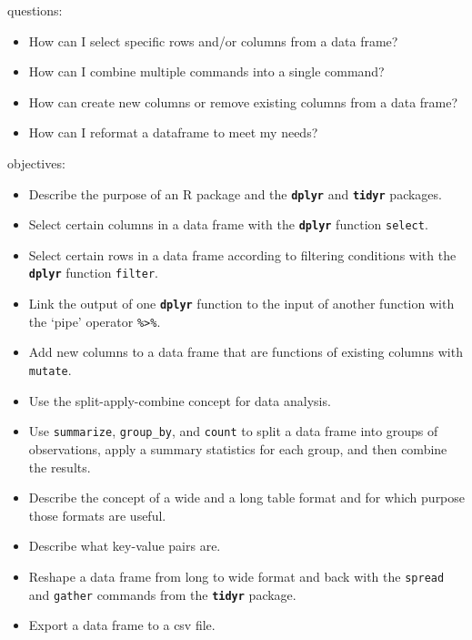 \documentclass[]{book}
\providecommand{\tightlist}{%
  \setlength{\itemsep}{0pt}\setlength{\parskip}{0pt}}
\begin{document}
questions:

\begin{itemize}
\tightlist
\item
  How can I select specific rows and/or columns from a data frame?\\
\item
  How can I combine multiple commands into a single command?\\
\item
  How can create new columns or remove existing columns from a data
  frame?\\
\item
  How can I reformat a dataframe to meet my needs?
\end{itemize}

objectives:

\begin{itemize}
\tightlist
\item
  Describe the purpose of an R package and the \textbf{\texttt{dplyr}}
  and \textbf{\texttt{tidyr}} packages.\\
\item
  Select certain columns in a data frame with the
  \textbf{\texttt{dplyr}} function \texttt{select}.\\
\item
  Select certain rows in a data frame according to filtering conditions
  with the \textbf{\texttt{dplyr}} function \texttt{filter}.\\
\item
  Link the output of one \textbf{\texttt{dplyr}} function to the input
  of another function with the `pipe' operator
  \texttt{\%\textgreater{}\%}.\\
\item
  Add new columns to a data frame that are functions of existing columns
  with \texttt{mutate}.\\
\item
  Use the split-apply-combine concept for data analysis.\\
\item
  Use \texttt{summarize}, \texttt{group\_by}, and \texttt{count} to
  split a data frame into groups of observations, apply a summary
  statistics for each group, and then combine the results.\\
\item
  Describe the concept of a wide and a long table format and for which
  purpose those formats are useful.
\item
  Describe what key-value pairs are.\\
\item
  Reshape a data frame from long to wide format and back with the
  \texttt{spread} and \texttt{gather} commands from the
  \textbf{\texttt{tidyr}} package.\\
\item
  Export a data frame to a csv file.
\end{itemize}
\end{document}
